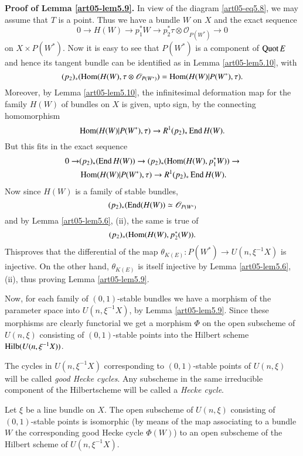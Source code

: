 \noindent
{\bf Proof of Lemma \ref{art05-lem5.9}.} In view of the
diagram \ref{art05-eq5.8}, we may assume that $T$ is a point. Thus we
have a bundle $W$ on $X$ and the exact sequence
$$
0\to H(W)\to p^{*}_{1}W\to
p^{*}_{2}\tau \otimes \mathscr{O}_{P(W^{*})}\to 0
$$
on $X\times P(W^{*})$. Now it is easy to see that $P(W^{*})$ is a
component of $\operatorname{Quot} E$ and hence its tangent bundle can be identified
as in Lemma \ref{art05-lem5.10}, with 
$$
(p_{2})_{*}(\operatorname{Hom}
(H(W),\tau\otimes \mathscr{O}_{P(W^{*})})=\operatorname{Hom}(H(W)|P(W^{*}),\tau).
$$ 
Moreover, by Lemma \ref{art05-lem5.10}, the infinitesimal deformation map for
the family $H(W)$ of bundles on $X$ is given, upto sign, by the
connecting homomorphism 
$$
\operatorname{Hom}(H(W)|P(W^{*}),\tau)\to
R^{1}(p_{2})_{*}\operatorname{End} H(W).
$$ 
But this fits in the exact sequence
\begin{align*}
0\to & (p_{2})_{*}(\operatorname{End} H(W))\to
(p_{2})_{*}(\operatorname{Hom}(H(W),p^{*}_{1}W))\to\\
&\operatorname{Hom} (H(W)|P(W^{*}),\tau)\to R^{1}(p_{2})_{*}\operatorname{End} H(W).
\end{align*}
Now since $H(W)$ is a family of stable bundles,
$$
(p_{2})_{*}(\operatorname{End} (H(W))\simeq \mathscr{O}_{P(W^{*})}
$$
and by Lemma \ref{art05-lem5.6}, (ii), the same is true of
$$
(p_{2})_{*}(\operatorname{Hom}(H(W),p^{*}_{2}(W)). 
$$ 
This\pageoriginale proves that the differential of the map
$\theta_{K(E)}:P(W^{*})\to U(n,\xi^{-1}X)$ is injective. On the other
hand, $\theta_{K(E)}$ is itself injective by Lemma \ref{art05-lem5.6},
(ii), thus proving Lemma \ref{art05-lem5.9}.

Now, for each family of $(0,1)$-stable bundles we have a morphism of
the parameter space into $U(n,\xi^{-1}X)$, by
Lemma \ref{art05-lem5.9}. Since these morphisms are clearly functorial
we get a morphism $\Phi$ on the open subscheme of $U(n,\xi)$
consisting of $(0,1)$-stable points into the Hilbert scheme
$\operatorname{Hilb}(U(n,\xi^{-1}X))$. 

\begin{definition}\label{art05-defi5.12}
The cycles in $U(n,\xi^{-1}X)$ corresponding to $(0,1)$-stable points
of $U(n,\xi)$ will be called {\em good Hecke cycles}. Any subscheme in the
same irreducible component of the Hilbert\break scheme will be called a
{\em Hecke cycle}.
\end{definition}

\begin{theorem}\label{art05-thm5.13}
Let $\xi$ be a line bundle on $X$. The open subscheme of $U(n,\xi)$
consisting of $(0,1)$-stable points is isomorphic (by means of the map
associating to a bundle $W$ the corresponding good Hecke cycle
$\Phi(W)$) to an open subscheme of the Hilbert scheme of
$U(n,\xi^{-1}X)$. 
\end{theorem}

